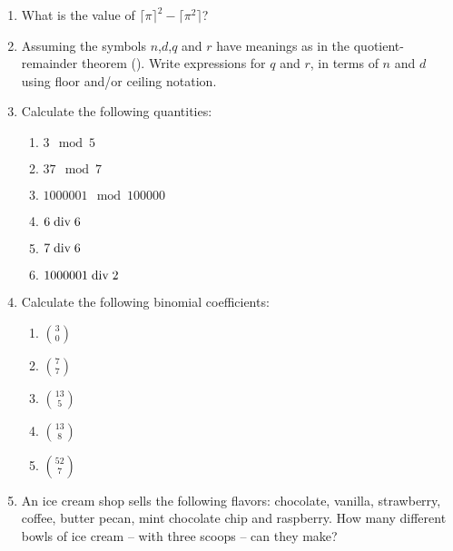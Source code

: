 \begin{enumerate}
\workbookpagebreak

\item What is the value of $\lceil\pi\rceil^{2}-\lceil\pi^{2}\rceil$?

\wbvfill




\item Assuming the symbols $n$,$d$,$q$ and $r$ have meanings as in the
  quotient-remainder theorem ().  Write
  expressions for $q$ and $r$, in terms of $n$ and $d$ using floor
  and/or ceiling notation.

\wbvfill


\textbookpagebreak

\item Calculate the following quantities:

\begin{enumerate}
\item $3 \mod 5$
\item $37 \mod 7$
\item $1000001 \mod 100000$
\item $6 \; \mbox{div} \; 6$
\item $7 \; \mbox{div} \; 6$
\item $1000001 \; \mbox{div} \; 2$
\end{enumerate}


\hintspagebreak
\workbookpagebreak

\item Calculate the following binomial coefficients:

\begin{enumerate}
\item $\binom{3}{0}$
\item $\binom{7}{7}$
\item $\binom{13}{5}$
\item $\binom{13}{8}$
\item $\binom{52}{7}$
\end{enumerate}


\item An ice cream shop sells the following flavors: chocolate, vanilla, 
strawberry, coffee, butter pecan, mint chocolate chip and raspberry.
How many different bowls of ice cream -- with three scoops -- can they make?  

\wbvfill


\end{enumerate}
